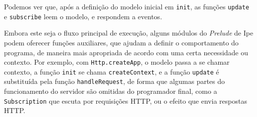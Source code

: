 Podemos ver que, após a definição do modelo inicial em \texttt{init}, as funções
\texttt{update} e \texttt{subscribe} leem o modelo, e respondem a eventos.

Embora este seja o fluxo principal de execução, alguns módulos do \textit{Prelude} de Ipe podem oferecer
funções auxiliares, que ajudam a definir o comportamento do programa, de maneira mais apropriada de
acordo com uma certa necessidade ou contexto. Por exemplo, com \texttt{Http.createApp}, o modelo
passa a se chamar contexto, a função \texttt{init} se chama \texttt{createContext}, e a função
\texttt{update} é substituída pela função \texttt{handleRequest}, de forma que algumas partes do
funcionamento do servidor são omitidas do programador final, como a \texttt{Subscription} que escuta
por requisições HTTP, ou o efeito que envia respostas HTTP.
